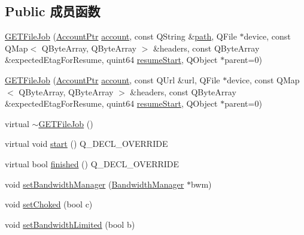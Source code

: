 \subsection*{Public 成员函数}
\begin{DoxyCompactItemize}
\item 
\hyperlink{class_o_c_c_1_1_g_e_t_file_job_aeffc1ce2c51ba5160fef7dc37821915c}{G\+E\+T\+File\+Job} (\hyperlink{namespace_o_c_c_a848616aedb9188e223c6b9867757fe69}{Account\+Ptr} \hyperlink{class_o_c_c_1_1_abstract_network_job_a469c9d8212a338ad07d1efa1a94f784d}{account}, const Q\+String \&\hyperlink{class_o_c_c_1_1_abstract_network_job_a8ed2423a454ec861c20f6900f5591ef7}{path}, Q\+File $\ast$device, const Q\+Map$<$ Q\+Byte\+Array, Q\+Byte\+Array $>$ \&headers, const Q\+Byte\+Array \&expected\+Etag\+For\+Resume, quint64 \hyperlink{class_o_c_c_1_1_g_e_t_file_job_a6b3c228a09b07ebcb6c72fb2f49c86ca}{resume\+Start}, Q\+Object $\ast$parent=0)
\item 
\hyperlink{class_o_c_c_1_1_g_e_t_file_job_a9fe65b419f36288b844d91f398137b20}{G\+E\+T\+File\+Job} (\hyperlink{namespace_o_c_c_a848616aedb9188e223c6b9867757fe69}{Account\+Ptr} \hyperlink{class_o_c_c_1_1_abstract_network_job_a469c9d8212a338ad07d1efa1a94f784d}{account}, const Q\+Url \&url, Q\+File $\ast$device, const Q\+Map$<$ Q\+Byte\+Array, Q\+Byte\+Array $>$ \&headers, const Q\+Byte\+Array \&expected\+Etag\+For\+Resume, quint64 \hyperlink{class_o_c_c_1_1_g_e_t_file_job_a6b3c228a09b07ebcb6c72fb2f49c86ca}{resume\+Start}, Q\+Object $\ast$parent=0)
\item 
virtual \hyperlink{class_o_c_c_1_1_g_e_t_file_job_a1d714f159e0649f6983e75438d56d776}{$\sim$\+G\+E\+T\+File\+Job} ()
\item 
virtual void \hyperlink{class_o_c_c_1_1_g_e_t_file_job_a82c449dd18bb5ba12e611d0447662cdb}{start} () Q\+\_\+\+D\+E\+C\+L\+\_\+\+O\+V\+E\+R\+R\+I\+DE
\item 
virtual bool \hyperlink{class_o_c_c_1_1_g_e_t_file_job_a41e95ff131e8009d6cd8c2d063eeb7c0}{finished} () Q\+\_\+\+D\+E\+C\+L\+\_\+\+O\+V\+E\+R\+R\+I\+DE
\item 
void \hyperlink{class_o_c_c_1_1_g_e_t_file_job_aafe5cf21c3b8365fdbf82890b5a84ce8}{set\+Bandwidth\+Manager} (\hyperlink{class_o_c_c_1_1_bandwidth_manager}{Bandwidth\+Manager} $\ast$bwm)
\item 
void \hyperlink{class_o_c_c_1_1_g_e_t_file_job_a032d6ada72eeb90405f185cd5d4fc60a}{set\+Choked} (bool c)
\item 
void \hyperlink{class_o_c_c_1_1_g_e_t_file_job_a000921888d1afcd2856427457dc15f6f}{set\+Bandwidth\+Limited} (bool b)

\end{DoxyCompactItemize}
